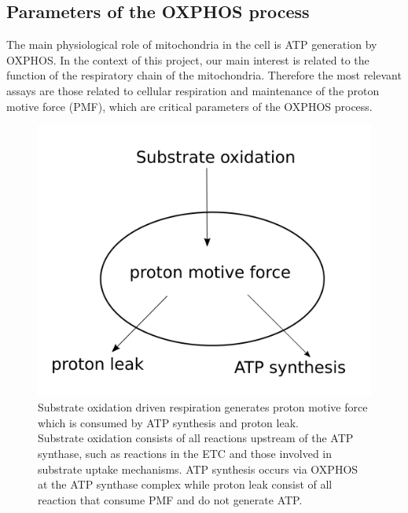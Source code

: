 \subsection{Parameters of the OXPHOS process}
The main physiological role of mitochondria in the cell is ATP generation by OXPHOS. In the context of this project, our main interest is related to the function of the respiratory chain of the mitochondria. Therefore the most relevant assays are those related to cellular respiration and maintenance of the proton motive force (PMF), which are critical parameters of the OXPHOS process. 
%
\begin{figure}[htp]
	\centering
    \includegraphics[width=.5\textwidth]{device}
    \caption[Components of OXPHOS respiration]{Substrate oxidation driven respiration generates proton motive force which is consumed by ATP synthesis and proton leak.\\Substrate oxidation consists of all reactions upstream of the ATP synthase, such as reactions in the ETC and those involved in substrate uptake mechanisms. ATP synthesis occurs via OXPHOS at the ATP synthase complex while proton leak consist of all reaction that consume PMF and do not generate ATP.}\label{fig:device}
\end{figure}
%

